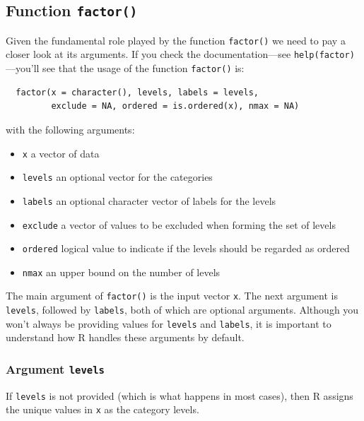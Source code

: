 \documentclass[
]{book}
\begin{document}
\hypertarget{function-factor}{%
\subsection{\texorpdfstring{Function \texttt{factor()}}{Function factor()}}\label{function-factor}}

Given the fundamental role played by the function \texttt{factor()} we need to pay a
closer look at its arguments. If you check the documentation---see
\texttt{help(factor)}---you'll see that the usage of the function \texttt{factor()} is:

\begin{verbatim}
  factor(x = character(), levels, labels = levels,
         exclude = NA, ordered = is.ordered(x), nmax = NA)
\end{verbatim}

with the following arguments:

\begin{itemize}
\item
  \texttt{x} a vector of data
\item
  \texttt{levels} an optional vector for the categories
\item
  \texttt{labels} an optional character vector of labels for the levels
\item
  \texttt{exclude} a vector of values to be excluded when forming the set of levels
\item
  \texttt{ordered} logical value to indicate if the levels should be regarded as ordered
\item
  \texttt{nmax} an upper bound on the number of levels
\end{itemize}

The main argument of \texttt{factor()} is the input vector \texttt{x}. The next argument is
\texttt{levels}, followed by \texttt{labels}, both of which are optional arguments. Although
you won't always be providing values for \texttt{levels} and \texttt{labels}, it is important
to understand how R handles these arguments by default.

\hypertarget{argument-levels}{%
\subsubsection*{\texorpdfstring{Argument \texttt{levels}}{Argument levels}}\label{argument-levels}}

If \texttt{levels} is not provided (which is what happens in most cases), then R
assigns the unique values in \texttt{x} as the category levels.
\end{document}
